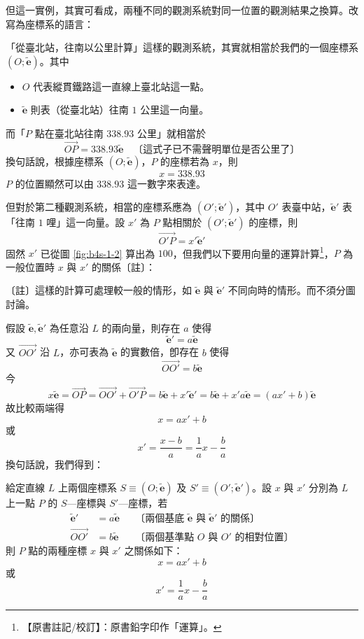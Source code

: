 但這一實例，其實可看成，兩種不同的觀測系統對同一位置的觀測結果之換算。改寫為座標系的語言：

「從臺北站，往南以公里計算」這樣的觀測系統，其實就相當於我們的一個座標系 $(O; \tilde{\mathbf{e}})$。其中
\begin{itemize}
  \item $O$ 代表縱貫鐵路這一直線上臺北站這一點。
  \item $\tilde{\mathbf{e}}$ 則表（從臺北站）往南 $1$ 公里這一向量。
\end{itemize}
而「$P$ 點在臺北站往南 $338.93$ 公里」就相當於
\[ \vec{OP} = 338.93 \tilde{\mathbf{e}} \quad \text{〔這式子已不需聲明單位是否公里了〕} \]
換句話說，根據座標系 $(O; \tilde{\mathbf{e}})$，$P$ 的座標若為 $x$，則
\[ x = 338.93 \]
$P$ 的位置顯然可以由 $338.93$ 這一數字來表達。

但對於第二種觀測系統，相當的座標系應為 $(O'; \tilde{\mathbf{e}}')$，其中 $O'$ 表臺中站，$\tilde{\mathbf{e}}'$ 表「往南 $1$ 哩」這一向量。設 $x'$ 為 $P$ 點相關於 $(O'; \tilde{\mathbf{e}}')$ 的座標，則
\[ \vec{O'P} = x' \tilde{\mathbf{e}}' \]
固然 $x'$ 已從圖 \ref{fig:b4s-1-2} 算出為 $100$，但我們以下要用向量的運算計算\label{note:b4s-ch1-p4-yunsuan}\footnote{【原書註記/校訂】：原書鉛字印作「運算」。}，$P$ 為一般位置時 $x$ 與 $x'$ 的關係〔註〕：

〔註〕這樣的計算可處理較一般的情形，如 $\tilde{\mathbf{e}}$ 與 $\tilde{\mathbf{e}}'$ 不同向時的情形。而不須分圖討論。

假設 $\tilde{\mathbf{e}}, \tilde{\mathbf{e}}'$ 為任意沿 $L$ 的兩向量，則存在 $a$ 使得
\[ \tilde{\mathbf{e}}' = a \tilde{\mathbf{e}} \]
又 $\vec{OO'}$ 沿 $L$，亦可表為 $\tilde{\mathbf{e}}$ 的實數倍，卽存在 $b$ 使得
\[ \vec{OO'} = b \tilde{\mathbf{e}} \]
今
\[ x \tilde{\mathbf{e}} = \vec{OP} = \vec{OO'} + \vec{O'P} = b \tilde{\mathbf{e}} + x' \tilde{\mathbf{e}}' = b \tilde{\mathbf{e}} + x' a \tilde{\mathbf{e}} = (ax' + b) \tilde{\mathbf{e}} \]
故比較兩端得
\[ x = ax' + b \]
或
\[ x' = \frac{x - b}{a} = \frac{1}{a} x - \frac{b}{a} \]
換句話說，我們得到：

\begin{theorem}[定理 1]
給定直線 $L$ 上兩個座標系 $S \equiv (O; \tilde{\mathbf{e}})$ 及 $S' \equiv (O'; \tilde{\mathbf{e}}')$。設 $x$ 與 $x'$ 分別為 $L$ 上一點 $P$ 的 $S$---座標與 $S'$---座標，若
\begin{align}
\tilde{\mathbf{e}}' &= a \tilde{\mathbf{e}} && \text{〔兩個基底 $\tilde{\mathbf{e}}$ 與 $\tilde{\mathbf{e}}'$ 的關係〕} \label{eq:b4s-1-1-2} \\
\vec{OO'} &= b \tilde{\mathbf{e}} && \text{〔兩個基準點 $O$ 與 $O'$ 的相對位置〕} \label{eq:b4s-1-1-2p}
\end{align}
則 $P$ 點的兩種座標 $x$ 與 $x'$ 之關係如下：
\begin{equation}
x = ax' + b \label{eq:b4s-1-1-3}
\end{equation}
或
\begin{equation}
x' = \frac{1}{a} x - \frac{b}{a} \label{eq:b4s-1-1-3p}
\end{equation}
\end{theorem}


